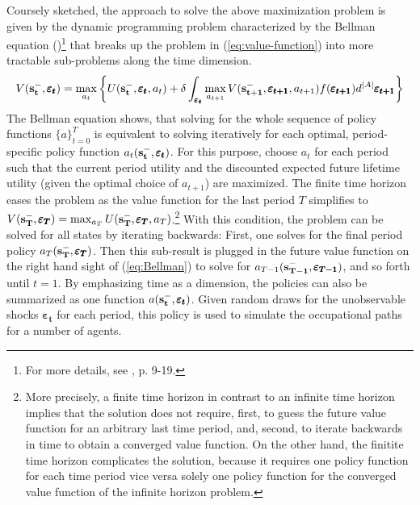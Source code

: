 Coursely sketched, the approach to solve the above maximization problem is given by the dynamic programming problem characterized by the Bellman equation (\cite{Bellman.1957})\footnote{For more details, see \cite{Raabe.2019}, p. 9-19.} that breaks up the problem in (\ref{eq:value-function}) into more tractable sub-problems along the time dimension.
\begin{align} \label{eq:Bellman}
V(\bold{s_t^-}, \pmb{\varepsilon_t}) = \max_{a_t} \bigg\{ U(\bold{s_t^-}, \pmb{\varepsilon_t}, a_t) + \delta \int_{\pmb{\varepsilon_t}} \max_{a_{t+1}} V(\bold{s_{t+1}^{-}},\pmb{\varepsilon_{t+1}},a_{t+1}) f(\pmb{\varepsilon_{t+1}})d^{|A|}\pmb{\varepsilon_{t+1}}\bigg\}
\end{align}
\noindent
The Bellman equation shows, that solving for the whole sequence of policy functions ${\{a\}_{t=0}^T}$ is equivalent to solving iteratively for each optimal, period-specific policy function $a_t(\bold{s_t^-}, \pmb{\varepsilon_t})$. For this purpose, choose $a_t$ for each period such that the current period utility and the discounted expected future lifetime utility (given the optimal choice of $a_{t+1}$) are maximized. The finite time horizon eases the problem as the value function for the last period $T$ simplifies to $V(\bold{s_T^-}, \pmb{\varepsilon_T}) = \max_{a_T} U(\bold{s_T^-}, \pmb{\varepsilon_T}, a_T)$.\footnote{More precisely, a finite time horizon in contrast to an infinite time horizon implies that the solution does not require, first, to  guess the future value function for an arbitrary last time period, and, second, to iterate backwards in time to obtain a converged value function. On the other hand, the finitite time horizon complicates the solution, because it requires one policy function for each time period vice versa solely one policy function for the converged value function of the infinite horizon problem.} With this condition, the problem can be solved for all states by iterating backwards: First, one solves for the final period policy $a_T(\bold{s_T^-}, \pmb{\varepsilon_T})$. Then this sub-result is plugged in the future value function on the right hand sight of (\ref{eq:Bellman}) to solve for $a_{T-1}(\bold{s_{T-1}^-}, \pmb{\varepsilon_{T-1}})$, and so forth until $t=1$. By emphasizing time as a dimension, the policies can also be summarized as one function $a(\bold{s_t^-}, \pmb{\varepsilon_t})$. Given random draws for the  unobservable shocks $\pmb{\varepsilon_t}$ for each period, this policy is used to simulate the occupational paths for a number of agents.\\

